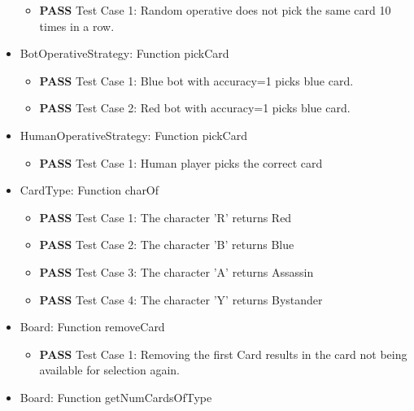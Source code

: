 \documentclass[12pt]{article}
\begin{document}
\begin{itemize}
    \begin{itemize}
        \item \textbf{PASS} Test Case 1: Random operative does not pick the same card 10 times in a row.
    \end{itemize}


\item BotOperativeStrategy: Function pickCard

    \begin{itemize}
        \item \textbf{PASS} Test Case 1: Blue bot with accuracy=1 picks blue card.
        \item \textbf{PASS} Test Case 2: Red bot with accuracy=1 picks blue card.
    \end{itemize}

\item HumanOperativeStrategy: Function pickCard

    \begin{itemize}
        \item \textbf{PASS} Test Case 1: Human player picks the correct card
    \end{itemize}


\item CardType: Function charOf

    \begin{itemize}
        \item \textbf{PASS} Test Case 1: The character 'R' returns Red
         \item \textbf{PASS} Test Case 2: The character 'B' returns Blue
          \item \textbf{PASS} Test Case 3: The character 'A' returns Assassin
           \item \textbf{PASS} Test Case 4: The character 'Y' returns Bystander
    \end{itemize}
    

\item Board: Function removeCard

    \begin{itemize}
        \item \textbf{PASS} Test Case 1: Removing the first Card results in the card not being available for selection again.
    \end{itemize}


\item Board: Function getNumCardsOfType


\end{itemize}
\end{document}
